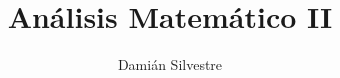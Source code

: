 \documentclass[11pt,fleqn]{book} %
\theoremstyle{plain}
\theoremstyle{definition}
\theoremstyle{remark}
\begin{document}
\title{Análisis Matemático II}
\author{Damián Silvestre}
\maketitle




\printindex
\end{document}

